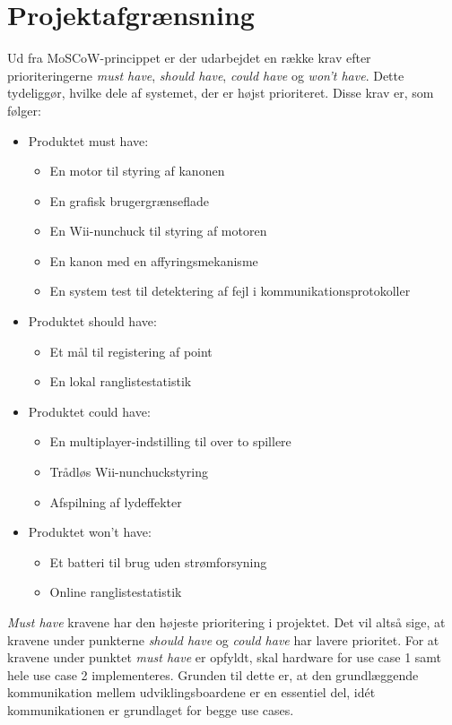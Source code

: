 \chapter{Projektafgrænsning}
\label{afsnit:Projektafgraensning}
Ud fra MoSCoW-princippet \cite{moscow} er der udarbejdet en række krav efter prioriteringerne \textit{must have}, \textit{should have}, \textit{could have} og \textit{won't have}. Dette tydeliggør, hvilke dele af systemet, der er højst prioriteret. Disse krav er, som følger:

\begin{itemize}
	\item Produktet must have:
	\begin{itemize}
		\item En motor til styring af kanonen
		\item En grafisk brugergrænseflade
		\item En Wii-nunchuck til styring af motoren
		\item En kanon med en affyringsmekanisme
		\item En system test til detektering af fejl i kommunikationsprotokoller
	\end{itemize}
	\item Produktet should have:
	\begin{itemize}
		\item Et mål til registering af point
		\item En lokal ranglistestatistik
	\end{itemize}
	\item Produktet could have:
	\begin{itemize}
		\item En multiplayer-indstilling til over to spillere
		\item Trådløs Wii-nunchuckstyring
		\item Afspilning af lydeffekter
	\end{itemize}
	\item Produktet won't have:
	\begin{itemize}
		\item Et batteri til brug uden strømforsyning
		\item Online ranglistestatistik
	\end{itemize}
\end{itemize}

\noindent \textit{Must have} kravene har den højeste prioritering i projektet. Det vil altså sige, at kravene under punkterne \textit{should have} og \textit{could have} har lavere prioritet. For at kravene under punktet \textit{must have} er opfyldt, skal hardware for use case 1 samt hele use case 2 implementeres. Grunden til dette er, at den grundlæggende kommunikation mellem udviklingsboardene er en essentiel del, idét kommunikationen er grundlaget for begge use cases.
